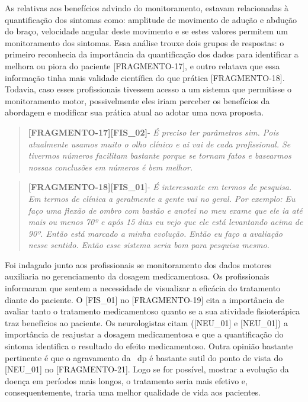 As relativas aos benefícios advindo do monitoramento, estavam relacionadas à quantificação dos sintomas como: amplitude de movimento de adução e abdução do braço,  velocidade angular deste movimento e se estes valores permitem um monitoramento dos sintomas. Essa análise trouxe dois grupos de respostas: o primeiro reconhecia da importância da quantificação dos dados para identificar a melhora ou piora do paciente [FRAGMENTO-17], e outro relatava que essa informação tinha mais validade científica do que prática [FRAGMENTO-18]. Todavia, caso esses profissionais tivessem acesso a um sistema que permitisse o monitoramento motor, possivelmente eles iriam perceber os benefícios da abordagem e modificar sua prática atual ao adotar uma nova proposta.

\begin{quote}
\textbf{[FRAGMENTO-17][FIS\_02]}-
\emph{
É preciso ter parâmetros sim. Pois atualmente usamos muito o olho clínico e ai vai de cada profissional. Se tivermos números facilitam bastante porque se tornam fatos e basearmos nossas conclusões em números é bem melhor.
}
\end{quote}

\begin{quote}
\textbf{[FRAGMENTO-18][FIS\_01]}-
\emph{
É interessante em termos de pesquisa. Em termos de clínica a geralmente a gente vai no geral. Por exemplo: Eu faço uma flexão de ombro com bastão e anotei no meu exame que ele ia até mais ou menos 70º e após 15 dias eu vejo que ele está levantando acima de 90º. Então está marcado a minha evolução. Então eu faço a avaliação nesse sentido. Então esse sistema seria bom para pesquisa mesmo.
}
\end{quote}

Foi indagado junto aos profissionais se monitoramento dos dados motores auxiliaria no gerenciamento da dosagem medicamentosa. Os profissionais informaram que sentem a necessidade de visualizar a eficácia do tratamento diante do paciente. O [FIS\_01] no [FRAGMENTO-19] cita a importância de avaliar tanto o tratamento medicamentoso quanto se a sua atividade fisioterápica traz benefícios ao paciente. Os neurologistas citam ([NEU\_01] e [NEU\_01]) a importância de reajustar a dosagem medicamentosa e que a quantificação do sintoma identifica o resultado do efeito medicamentoso. Outra opinião bastante pertinente é que o agravamento da ~\ac{dp} é bastante sutil do ponto de vista do [NEU\_01] no [FRAGMENTO-21]. Logo se for possível, mostrar a evolução da doença em períodos mais longos, o tratamento seria mais efetivo e, consequentemente, traria uma melhor qualidade de vida aos pacientes.

